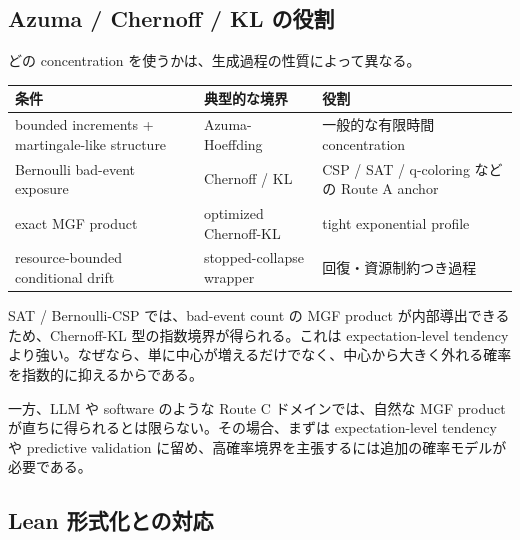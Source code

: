 \documentclass[12pt,a4paper]{article}
\begin{document}
\subsection{Azuma / Chernoff / KL の役割}\label{azuma-chernoff-kl-ux306eux5f79ux5272}

どの concentration を使うかは、生成過程の性質によって異なる。

{\def\LTcaptype{table} %
\begin{longtable}[]{@{}
  >{\raggedright\arraybackslash}p{}
  >{\raggedright\arraybackslash}p{}
  >{\raggedright\arraybackslash}p{}@{}}
\toprule\noalign{}
\begin{minipage}[b]{\linewidth}\raggedright
条件
\end{minipage} & \begin{minipage}[b]{\linewidth}\raggedright
典型的な境界
\end{minipage} & \begin{minipage}[b]{\linewidth}\raggedright
役割
\end{minipage} \\
\midrule\noalign{}
\endhead
\bottomrule\noalign{}
\endlastfoot
bounded increments + martingale-like structure & Azuma-Hoeffding & 一般的な有限時間 concentration \\
Bernoulli bad-event exposure & Chernoff / KL & CSP / SAT / q-coloring などの Route A anchor \\
exact MGF product & optimized Chernoff-KL & tight exponential profile \\
resource-bounded conditional drift & stopped-collapse wrapper & 回復・資源制約つき過程 \\
\end{longtable}
}

SAT / Bernoulli-CSP では、bad-event count の MGF product が内部導出できるため、Chernoff-KL 型の指数境界が得られる。これは expectation-level tendency より強い。なぜなら、単に中心が増えるだけでなく、中心から大きく外れる確率を指数的に抑えるからである。

一方、LLM や software のような Route C ドメインでは、自然な MGF product が直ちに得られるとは限らない。その場合、まずは expectation-level tendency や predictive validation に留め、高確率境界を主張するには追加の確率モデルが必要である。

\subsection{Lean 形式化との対応}\label{lean-ux5f62ux5f0fux5316ux3068ux306eux5bfeux5fdc-1}
\end{document}
